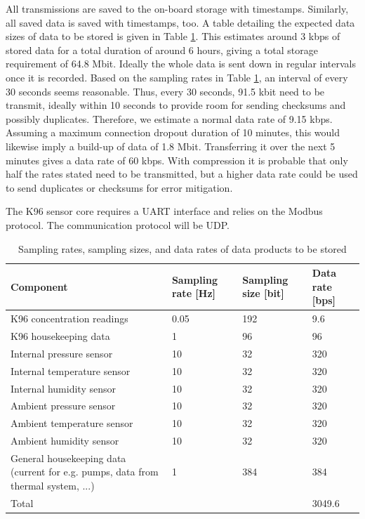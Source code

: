 \documentclass[12pt,a4paper]{report}
\begin{document}
All transmissions are saved to the on-board storage with timestamps. Similarly, all saved data is saved with timestamps, too. A table detailing the expected data sizes of data to be stored is given in Table \ref{tab:data_rates}. This estimates around 3 kbps of stored data for a total duration of around 6 hours, giving a total storage requirement of 64.8 Mbit. Ideally the whole data is sent down in regular intervals once it is recorded. Based on the sampling rates in Table \ref{tab:data_rates}, an interval of every 30 seconds seems reasonable. Thus, every 30 seconds, 91.5 kbit need to be transmit, ideally within 10 seconds to provide room for sending checksums and possibly duplicates. Therefore, we estimate a normal data rate of 9.15 kbps. Assuming a maximum connection dropout duration of 10 minutes, this would likewise imply a build-up of data of 1.8 Mbit. Transferring it over the next 5 minutes gives a data rate of 60 kbps. With compression it is probable that only half the rates stated need to be transmitted, but a higher data rate could be used to send duplicates or checksums for error mitigation.

The K96 sensor core requires a UART interface and relies on the Modbus protocol. The communication protocol will be UDP.

\begin{table}[H]
\centering
\caption{Sampling rates, sampling sizes, and data rates of data products to be stored}
\label{tab:data_rates}
\begin{tabular}{p{7cm}p{2cm}p{2cm}p{2cm}}
\toprule
\textbf{Component} & \textbf{Sampling rate [Hz]} & \textbf{Sampling size [bit]} & \textbf{Data rate [bps]} \\
\midrule
K96 concentration readings & 0.05 & 192 & 9.6 \\
K96 housekeeping data & 1 & 96 & 96 \\
Internal pressure sensor & 10 & 32 & 320 \\
Internal temperature sensor & 10 & 32 & 320 \\
Internal humidity sensor & 10 & 32 & 320 \\
Ambient pressure sensor & 10 & 32 & 320 \\
Ambient temperature sensor & 10 & 32 & 320 \\
Ambient humidity sensor & 10 & 32 & 320 \\
General housekeeping data (current for e.g. pumps, data from thermal system, ...) & 1 & 384 & 384 \\
\midrule
Total & & & 3049.6 \\
\bottomrule
\end{tabular}
\end{table}
\end{document}
